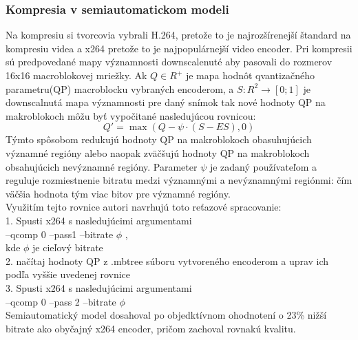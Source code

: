 \documentclass[10pt,twoside,slovak,a4paper]{article}
\begin{document}
\subsubsection{Kompresia v semiautomatickom modeli}
Na kompresiu si tvorcovia\cite{Coplien:MPD} vybrali H.264, pretože to je najrozšírenejší štandard na kompresiu videa a x264 pretože to je najpopulárnejší video encoder. Pri kompresii sú predpovedané mapy významnosti downscalenuté aby pasovali do rozmerov 16x16 macroblokovej mriežky. Ak  \(Q \in R^+\) je mapa hodnôt qvantizačného parametru(QP) macroblocku vybraných encoderom, a \(S : R^2\rightarrow [0;1]\) je downscalnutá mapa významnosti pre daný snímok tak nové hodnoty QP na makroblokoch môžu byť vypočitané nasledujúcou rovnicou:
\[{Q}' = \max(Q - \psi \cdot (S - ES),0)\]
Týmto spôsobom redukujú hodnoty QP na makroblokoch obasuhujúcich významné regióny alebo naopak zväčšujú hodnoty QP na makroblokoch obsahujúcich nevýznamné regióny. Parameter \(\psi\) je zadaný používateľom a reguluje rozmiestnenie bitratu medzi významnými a nevýznamnými regiónmi: čím väčšia hodnota tým viac bitov pre významné regióny.\\
Využitím tejto rovnice autori\cite{Coplien:MPD} navrhujú toto reťazové spracovanie:\\
1. Spusti x264 s nasledujúcimi argumentami\\
--qcomp 0 --pass1 --bitrate \( \phi\) ,\\
kde \( \phi\) je cieľový bitrate\\
2. načítaj hodnoty QP z .mbtree súboru vytvoreného encoderom a uprav ich podľa vyššie uvedenej rovnice \\
3. Spusti x264 s nasledujúcimi argumentami\\
--qcomp 0 --pass 2 --bitrate \(\phi\)\\
Semiautomatický model dosahoval po objedktívnom ohodnotení o 23\% nižší bitrate ako obyčajný x264 encoder, pričom zachoval rovnakú kvalitu.
\end{document}
